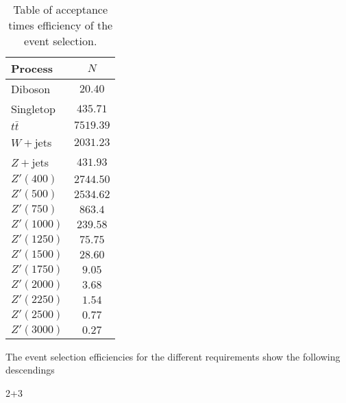 \begin{table}[H]
	\begin{tabular}{l|c}
		 Process & $N$\\
		\hline
		Diboson &$20.40$\\
		Singletop&$435.71$\\
		$t\bar t$&$7519.39$\\
		$W+$jets&$2031.23$\\
		$Z+$jets&$431.93$\\
		\hline
		$Z'(400)$&$2744.50$\\
		$Z'(500)$&$2534.62 $\\
		$Z'(750)$&$863.4$\\
		$Z'(1000)$&$239.58$\\
		$Z'(1250)$&$75.75$\\
		$Z'(1500)$&$28.60$\\
		$Z'(1750)$&$9.05$\\
		$Z'(2000)$&$3.68$\\
		$Z'(2250)$&$1.54$\\
		$Z'(2500)$&$0.77$\\
		$Z'(3000)$&$0.27$
	\end{tabular}
	\caption{Table of acceptance times efficiency of the event selection.}
	\label{tab: acc_times_eff}
\end{table}

The event selection efficiencies for the different requirements show the following descendings

2+3
	

